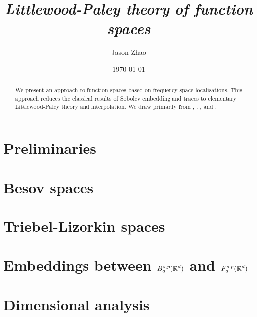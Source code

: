 \documentclass[reqno]{amsart}
\title
{
	\emph{Littlewood-Paley theory of function spaces}
}
\author{Jason Zhao}
\date{\today}
\begin{document}
\maketitle

\begin{abstract}
	We present an approach to function spaces based on frequency space localisations. This approach reduces the classical results of Sobolev embedding and traces to elementary Littlewood-Paley theory and interpolation. We draw primarily from \cite{Triebel1983}, \cite{BahouriEtAl2011}, \cite{WangEtAl2011}, and \cite{Grafakos2014a}. 
\end{abstract}

\tableofcontents

\section{Preliminaries}


\section{Besov spaces}


\section{Triebel-Lizorkin spaces}


\section{Embeddings between $B^{s, p}_q (\mathbb R^d)$ and $F^{s, p}_q (\mathbb R^d)$}


\section{Dimensional analysis}






\end{document}
